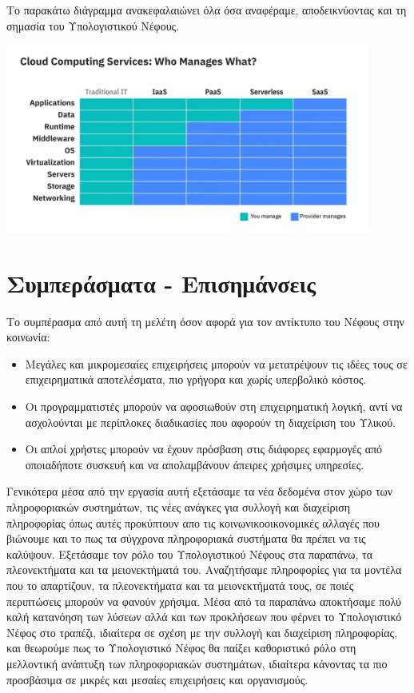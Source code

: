 \documentclass{article}
\begin{document}
Το παρακάτω διάγραμμα ανακεφαλαιώνει όλα όσα αναφέραμε, αποδεικνύοντας και τη σημασία του Υπολογιστικού Νέφους. 


\includegraphics[width=120mm]{ibm.jpg}

\section{Συμπεράσματα - Επισημάνσεις}
Το συμπέρασμα από αυτή τη μελέτη όσον αφορά για τον αντίκτυπο του Νέφους στην κοινωνία:
\begin{itemize}
\item Μεγάλες και μικρομεσαίες επιχειρήσεις μπορούν να μετατρέψουν τις ιδέες τους σε επιχειρηματικά αποτελέσματα, πιο γρήγορα και χωρίς υπερβολικό κόστος.
\item Οι προγραμματιστές μπορούν να αφοσιωθούν στη επιχειρηματική λογική, αντί να ασχολούνται με περίπλοκες διαδικασίες που αφορούν τη διαχείριση του Υλικού.
\item	Οι απλοί χρήστες μπορούν να έχουν πρόσβαση στις διάφορες εφαρμογές από οποιαδήποτε συσκευή και να απολαμβάνουν άπειρες χρήσιμες υπηρεσίες.
\end{itemize}
Γενικότερα μέσα από την εργασία αυτή εξετάσαμε τα νέα δεδομένα στον χώρο των πληροφοριακών συστημάτων, τις νέες ανάγκες για συλλογή και διαχείριση πληροφορίας όπως αυτές προκύπτουν απο τις κοινωνικοοικονομικές αλλαγές που βιώνουμε και το πως τα σύγχρονα πληροφοριακά συστήματα θα πρέπει να τις καλύψουν. Εξετάσαμε τον ρόλο του Υπολογιστικού Νέφους στα παραπάνω, τα πλεονεκτήματα και τα μειονεκτήματά του. Αναζητήσαμε πληροφορίες για τα μοντέλα που το απαρτίζουν, τα πλεονεκτήματα και τα μειονεκτήματά τους, σε ποιές περιπτώσεις μπορούν να φανούν χρήσιμα. Μέσα από τα παραπάνω αποκτήσαμε πολύ καλή κατανόηση των λύσεων αλλά και των προκλήσεων που φέρνει το Υπολογιστικό Νέφος στο τραπέζι, ιδιαίτερα σε σχέση με την συλλογή και διαχείριση πληροφορίας, και θεωρούμε πως το Υπολογιστικό Νέφος θα παίξει καθοριστικό ρόλο στη μελλοντική ανάπτυξη των πληροφοριακών συστημάτων, ιδιαίτερα κάνοντας τα πιο προσβάσιμα σε μικρές και μεσαίες επιχειρήσεις και οργανισμούς.
\end{document}
